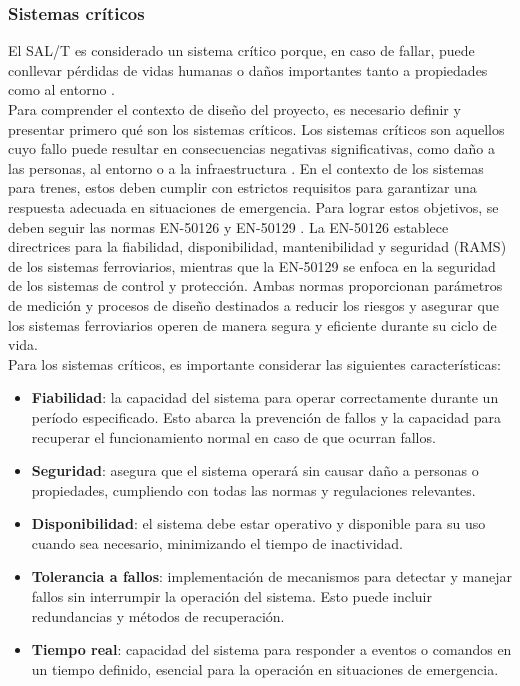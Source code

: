 

\subsubsection{Sistemas críticos}


El SAL/T es considerado un sistema crítico porque, en caso de fallar, puede conllevar pérdidas de vidas humanas o daños importantes tanto a propiedades como al entorno \cite{norma_61508}. \\

Para comprender el contexto de diseño del proyecto, es necesario definir y presentar primero qué son los sistemas críticos. Los sistemas críticos son aquellos cuyo fallo puede resultar en consecuencias negativas significativas, como daño a las personas, al entorno o a la infraestructura \cite{norma_61508}. En el contexto de los sistemas para trenes, estos deben cumplir con estrictos requisitos para garantizar una respuesta adecuada en situaciones de emergencia. Para lograr estos objetivos, se deben seguir las normas EN-50126 y EN-50129 \cite{norma_50129}. La EN-50126 establece directrices para la fiabilidad, disponibilidad, mantenibilidad y seguridad (RAMS) de los sistemas ferroviarios, mientras que la EN-50129 se enfoca en la seguridad de los sistemas de control y protección. Ambas normas proporcionan parámetros de medición y procesos de diseño destinados a reducir los riesgos y asegurar que los sistemas ferroviarios operen de manera segura y eficiente durante su ciclo de vida.\\


Para los sistemas críticos, es importante considerar las siguientes características: 
\begin{itemize}
    \item \textbf{Fiabilidad}: la capacidad del sistema para operar correctamente durante un período especificado. Esto abarca la prevención de fallos y la capacidad para recuperar el funcionamiento normal en caso de que ocurran fallos. 
    \item \textbf{Seguridad}: asegura que el sistema operará sin causar daño a personas o propiedades, cumpliendo con todas las normas y regulaciones relevantes.
    \item \textbf{Disponibilidad}: el sistema debe estar operativo y disponible para su uso cuando sea necesario, minimizando el tiempo de inactividad.
    \item \textbf{Tolerancia a fallos}: implementación de mecanismos para detectar y manejar fallos sin interrumpir la operación del sistema. Esto puede incluir redundancias y métodos de recuperación.
    \item \textbf{Tiempo real}: capacidad del sistema para responder a eventos o comandos en un tiempo definido, esencial para la operación en situaciones de emergencia.
\end{itemize}

